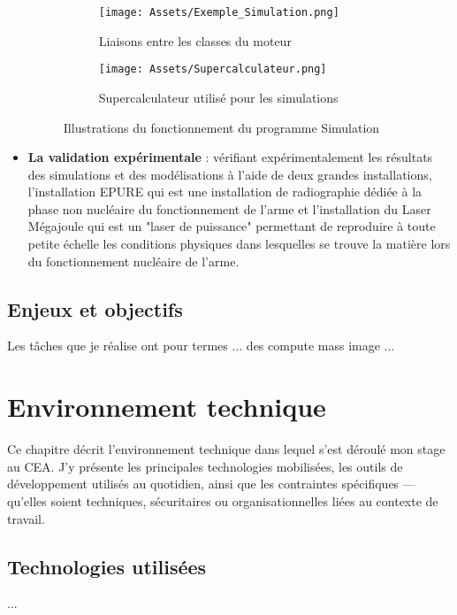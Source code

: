 \documentclass[12pt,a4paper]{report}
\begin{document}
\begin{itemize}
\begin{figure}[H]
    \hspace{0cm} %
    \begin{subfigure}[t]{0.42\textwidth}
        \centering
        \texttt{[image: Assets/Exemple\_Simulation.png]}
        \caption{Liaisons entre les classes du moteur}
    \end{subfigure}
    \hspace{10em} %
    \begin{subfigure}[t]{0.42\textwidth}
        \centering
        \texttt{[image: Assets/Supercalculateur.png]}
        \caption{Supercalculateur utilisé pour les simulations}
    \end{subfigure}
    \caption{Illustrations du fonctionnement du programme Simulation}
    \label{fig:images}
\end{figure}

\item \textbf{La validation expérimentale} : vérifiant expérimentalement les résultats des simulations et des modélisations à l'aide de deux grandes installations, l'installation EPURE qui est une installation de radiographie dédiée à la phase non nucléaire du fonctionnement de l'arme et l'installation du Laser Mégajoule qui est un "laser de puissance" permettant de reproduire à toute petite échelle les conditions physiques dans lesquelles se trouve la matière lors du fonctionnement nucléaire de l'arme.
\end{itemize}

\section{Enjeux et objectifs}
Les tâches que je réalise ont pour termes ... des compute mass image ...


\chapter{Environnement technique}

Ce chapitre décrit l’environnement technique dans lequel s’est déroulé mon stage au CEA. J’y présente les principales technologies mobilisées, les outils de développement utilisés au quotidien, ainsi que les contraintes spécifiques — qu’elles soient techniques, sécuritaires ou organisationnelles liées au contexte de travail.

\section{Technologies utilisées}
... %
\end{document}
